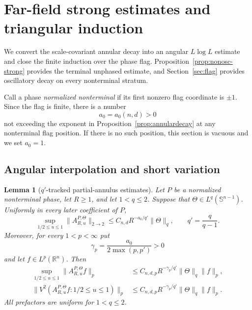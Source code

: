 \documentclass[11pt]{article}
\numberwithin{equation}{section}
\newtheorem{lemma}[theorem]{Lemma}
\theoremstyle{remark}
\theoremstyle{definition}
\newcommand{\R}{\mathbb R}
\newcommand{\Sph}{\mathbb S}
\newcommand{\norm}[1]{\lVert #1\rVert}
\begin{document}
\section{Far-field strong estimates and triangular induction}
\label{sec:strong-far}

We convert the scale-covariant annular decay into an angular
$L\log L$ estimate and close the finite induction over the phase flag.
Proposition~\ref{prop:nonosc-strong} provides the terminal unphased
estimate, and Section~\ref{sec:flag} provides oscillatory decay on every
nonterminal stratum.

Call a phase \emph{normalized nonterminal} if its first nonzero flag
coordinate is $\pm1$.  Since the flag is finite, there is a number
\begin{equation}\label{eq:strong-far-a0}
 a_0=a_0(n,d)>0
\end{equation}
not exceeding the exponent in Proposition~\ref{prop:annulardecay} at any
nonterminal flag position.  If there is no such position, this section is
vacuous and we set $a_0=1$.

\subsection{Angular interpolation and short variation}

\begin{lemma}[$q'$-tracked partial-annulus estimates]
\label{lem:qtracked-annulus}
Let $P$ be a normalized nonterminal phase, let $R\geq1$, and let
$1<q\leq2$.  Suppose that
$\Theta\in L^q(\Sph^{n-1})$.  Uniformly in every later coefficient of $P$,
\begin{equation}\label{eq:qtracked-L2-annulus}
 \sup_{1/2\leq u\leq1}
 \norm{A^{P,\Theta}_{R,u}}_{2\to2}
 \leq C_{n,d}R^{-a_0/q'}\norm\Theta_q,
 \qquad q'=\frac q{q-1}.
\end{equation}
Moreover, for every $1<p<\infty$ put
\begin{equation}\label{eq:gamma-p}
 \gamma_p=\frac{a_0}{2\max(p,p')}>0
\end{equation}
and let $f\in L^p(\R^n)$.  Then
\begin{align}
 \sup_{1/2\leq u\leq1}
 \norm{A^{P,\Theta}_{R,u}f}_p
 &\leq C_{n,d,p}R^{-\gamma_p/q'}
       \norm\Theta_q\norm f_p,
 \label{eq:qtracked-Lp-annulus}\\
 \norm{V^2(A^{P,\Theta}_{R,u}f:1/2\leq u\leq1)}_p
 &\leq C_{n,d,p}R^{-\gamma_p/q'}
       \norm\Theta_q\norm f_p.
 \label{eq:qtracked-short}
\end{align}
All prefactors are uniform for $1<q\leq2$.
\end{lemma}
\end{document}

